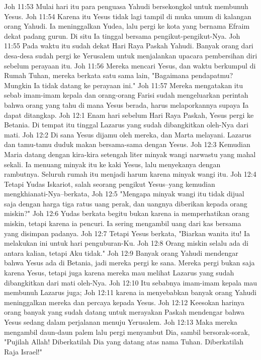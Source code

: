 Joh 11:53  Mulai hari itu para penguasa Yahudi bersekongkol untuk membunuh Yesus.
Joh 11:54  Karena itu Yesus tidak lagi tampil di muka umum di kalangan orang Yahudi. Ia meninggalkan Yudea, lalu pergi ke kota yang bernama Efraim dekat padang gurun. Di situ Ia tinggal bersama pengikut-pengikut-Nya.
Joh 11:55  Pada waktu itu sudah dekat Hari Raya Paskah Yahudi. Banyak orang dari desa-desa sudah pergi ke Yerusalem untuk menjalankan upacara pembersihan diri sebelum perayaan itu.
Joh 11:56  Mereka mencari Yesus, dan waktu berkumpul di Rumah Tuhan, mereka berkata satu sama lain, "Bagaimana pendapatmu? Mungkin Ia tidak datang ke perayaan ini."
Joh 11:57  Mereka mengatakan itu sebab imam-imam kepala dan orang-orang Farisi sudah mengeluarkan perintah bahwa orang yang tahu di mana Yesus berada, harus melaporkannya supaya Ia dapat ditangkap.
Joh 12:1  Enam hari sebelum Hari Raya Paskah, Yesus pergi ke Betania. Di tempat itu tinggal Lazarus yang sudah dibangkitkan oleh-Nya dari mati.
Joh 12:2  Di sana Yesus dijamu oleh mereka, dan Marta melayani. Lazarus dan tamu-tamu duduk makan bersama-sama dengan Yesus.
Joh 12:3  Kemudian Maria datang dengan kira-kira setengah liter minyak wangi narwastu yang mahal sekali. Ia menuang minyak itu ke kaki Yesus, lalu menyekanya dengan rambutnya. Seluruh rumah itu menjadi harum karena minyak wangi itu.
Joh 12:4  Tetapi Yudas Iskariot, salah seorang pengikut Yesus--yang kemudian mengkhianati-Nya--berkata,
Joh 12:5  "Mengapa minyak wangi itu tidak dijual saja dengan harga tiga ratus uang perak, dan uangnya diberikan kepada orang miskin?"
Joh 12:6  Yudas berkata begitu bukan karena ia memperhatikan orang miskin, tetapi karena ia pencuri. Ia sering mengambil uang dari kas bersama yang disimpan padanya.
Joh 12:7  Tetapi Yesus berkata, "Biarkan wanita itu! Ia melakukan ini untuk hari penguburan-Ku.
Joh 12:8  Orang miskin selalu ada di antara kalian, tetapi Aku tidak."
Joh 12:9  Banyak orang Yahudi mendengar bahwa Yesus ada di Betania, jadi mereka pergi ke sana. Mereka pergi bukan saja karena Yesus, tetapi juga karena mereka mau melihat Lazarus yang sudah dibangkitkan dari mati oleh-Nya.
Joh 12:10  Itu sebabnya imam-imam kepala mau membunuh Lazarus juga;
Joh 12:11  karena ia menyebabkan banyak orang Yahudi meninggalkan mereka dan percaya kepada Yesus.
Joh 12:12  Keesokan harinya orang banyak yang sudah datang untuk merayakan Paskah mendengar bahwa Yesus sedang dalam perjalanan menuju Yerusalem.
Joh 12:13  Maka mereka mengambil daun-daun palem lalu pergi menyambut Dia, sambil bersorak-sorak, "Pujilah Allah! Diberkatilah Dia yang datang atas nama Tuhan. Diberkatilah Raja Israel!"
